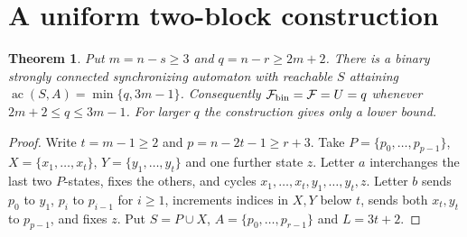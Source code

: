 \documentclass[10pt]{article}
\newtheorem{theorem}{Theorem}
\newcommand{\ac}{\operatorname{ac}}
\newcommand{\Max}{\mathcal F}
\begin{document}
\section{A uniform two-block construction}
\begin{theorem}\label{thm:two-block}
Put $m=n-s\ge3$ and $q=n-r\ge2m+2$.
There is a binary strongly connected synchronizing automaton with reachable
$S$ attaining $\ac(S,A)=\min\{q,3m-1\}$.
Consequently $\Max_{\rm bin}=\Max=U=q$ whenever $2m+2\le q\le3m-1$.
For larger $q$ the construction gives only a lower bound.
\end{theorem}
\begin{proof}
Write $t=m-1\ge2$ and $p=n-2t-1\ge r+3$.
Take $P=\{p_0,\ldots,p_{p-1}\}$, $X=\{x_1,\ldots,x_t\}$,
$Y=\{y_1,\ldots,y_t\}$ and one further state $z$.
Letter $a$ interchanges the last two $P$-states, fixes the others, and
cycles $x_1,\ldots,x_t,y_1,\ldots,y_t,z$.
Letter $b$ sends $p_0$ to $y_1$, $p_i$ to $p_{i-1}$ for $i\ge1$,
increments indices in $X,Y$ below $t$, sends both $x_t,y_t$ to $p_{p-1}$,
and fixes $z$. Put $S=P\cup X$, $A=\{p_0,\ldots,p_{r-1}\}$ and $L=3t+2$.


\end{proof}
\end{document}

